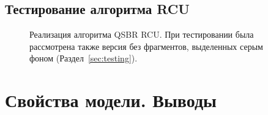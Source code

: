 \subsection{Тестирование алгоритма RCU}



\begin{figure*}[t]

\caption[Реализация алгоритма QSBR RCU]
{Реализация алгоритма QSBR RCU.
 При тестировании была рассмотрена также версия без фрагментов, выделенных серым фоном
 (Раздел~\ref{sec:testing}).}
\label{fig:rcuProg}
\end{figure*}

\section{Свойства модели. Выводы}

